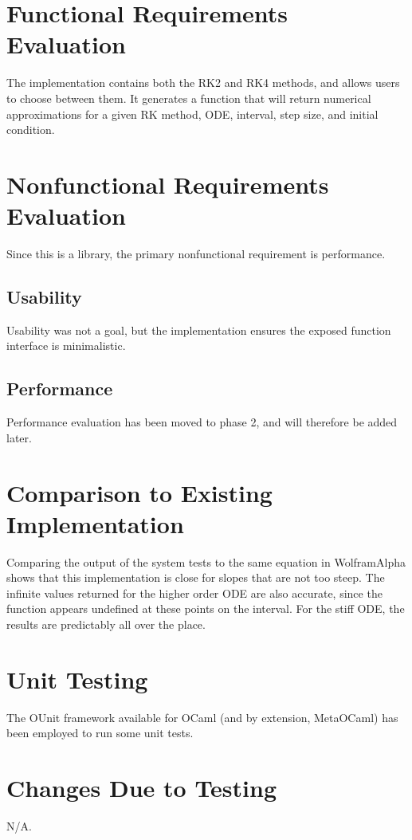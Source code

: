 \documentclass[12pt, titlepage]{article}
\begin{document}
\section{Functional Requirements Evaluation}
The implementation contains both the RK2 and RK4 methods, and allows users to 
choose between them. It generates a function that will return numerical 
approximations for a given RK method, ODE, interval, step size, and initial 
condition.

\section{Nonfunctional Requirements Evaluation}
Since this is a library, the primary nonfunctional requirement is performance.

\subsection{Usability}
Usability was not a goal, but the implementation ensures the exposed function 
interface is minimalistic.

\subsection{Performance}
Performance evaluation has been moved to phase 2, and will therefore be added 
later.
	
\section{Comparison to Existing Implementation}	
Comparing the output of the system tests to the same equation in WolframAlpha 
shows that this implementation is close for slopes that are not too steep.
The infinite values returned for the higher order ODE are also accurate, since 
the function appears undefined at these points on the interval. For the stiff 
ODE, the results are predictably all over the place.

\section{Unit Testing}
The OUnit framework available for OCaml (and by extension, MetaOCaml) has been 
employed to run some unit tests.

\section{Changes Due to Testing}
N/A.
\end{document}
